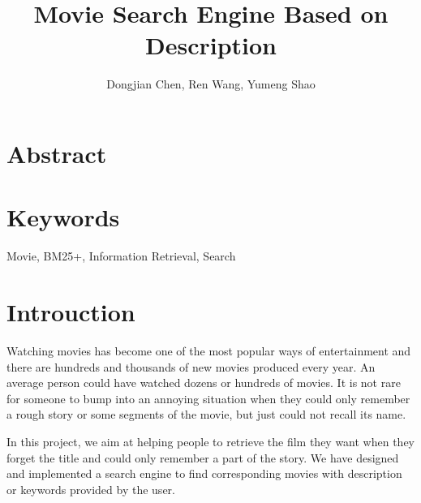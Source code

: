 \documentclass[letterpaper,10pt]{article}
\title{Movie Search Engine Based on Description}
\author{Dongjian Chen, Ren Wang, Yumeng Shao}
\begin{document}
\maketitle

\begin{multicols}{2}
    \section*{Abstract}

    \section*{Keywords}

    Movie, BM25+, Information Retrieval, Search

    \vfill\null
    \columnbreak


    \section{Introuction}

    Watching movies has become one of the most popular ways of entertainment and there are hundreds and thousands of new movies produced every year.
    An average person could have watched dozens or hundreds of movies.
    It is not rare for someone to bump into an annoying situation when they could only remember a rough story or some segments of the movie, but just could not recall its name.

    In this project, we aim at helping people to retrieve the film they want when they forget the title and could only remember a part of the story.
    We have designed and implemented a search engine to find corresponding movies with description or keywords provided by the user.




\end{multicols}
\end{document}
